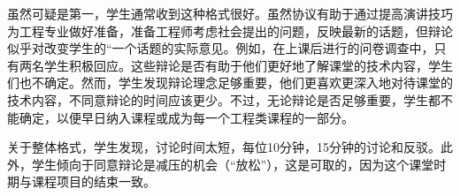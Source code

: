 虽然可疑是第一，学生通常收到这种格式很好。虽然协议有助于通过提高演讲技巧为工程专业做好准备，准备工程师考虑社会提出的问题，反映最新的话题，但辩论似乎对改变学生的“一个话题的实际意见。例如，在上课后进行的问卷调查中，只有两名学生积极回应。这些辩论是否有助于他们更好地了解课堂的技术内容，学生们也不确定。然而，学生发现辩论理念足够重要，他们更喜欢更深入地对待课堂的技术内容，不同意辩论的时间应该更少。不过，无论辩论是否足够重要，学生都不能确定，以便早日纳入课程或成为每一个工程类课程的一部分。

关于整体格式，学生发现，讨论时间太短，每位10分钟，15分钟的讨论和反驳。此外，学生倾向于同意辩论是减压的机会（“放松”），这是可取的，因为这个课堂时期与课程项目的结束一致。